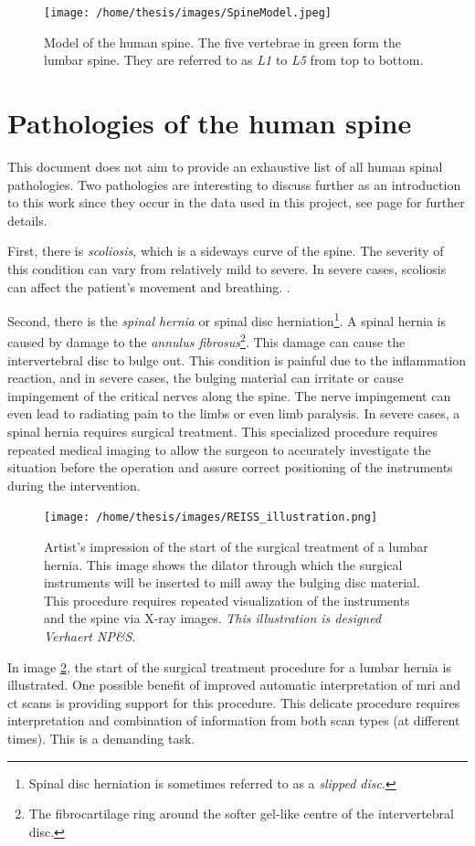 \begin{figure}
    \centering
    \texttt{[image: /home/thesis/images/SpineModel.jpeg]}
    \caption{\label{fig:spineimage}Model of the human spine. The five vertebrae in green form the lumbar spine. They are referred to as \textit{L1} to \textit{L5} from top to bottom. }
\end{figure}

\section{Pathologies of the human spine}
\par{
    This document does not aim to provide an exhaustive list of all human spinal pathologies. 
    Two pathologies are interesting to discuss further as an introduction to this work since they occur in the data used in this project, see page \pageref{sec:datasets} for further details.
}
\par{
    First, there is \textit{scoliosis}, which is a sideways curve of the spine.
    The severity of this condition can vary from relatively mild to severe. 
    In severe cases, scoliosis can affect the patient's movement and breathing.
    .
}
\par{
    Second, there is the \textit{spinal hernia} or spinal disc herniation\footnote{Spinal disc herniation is sometimes referred to as a \textit{slipped disc}.}. 
    A spinal hernia is caused by damage to the \textit{annulus fibrosus}\footnote{The fibrocartilage ring around the softer gel-like centre of the intervertebral disc.}. 
    This damage can cause the intervertebral disc to bulge out. 
    This condition is painful due to the inflammation reaction, and in severe cases, the bulging material can irritate or cause impingement of the critical nerves along the spine.
    The nerve impingement can even lead to radiating pain to the limbs or even limb paralysis.
    In severe cases, a spinal hernia requires surgical treatment.
    This specialized procedure requires repeated medical imaging to allow the surgeon to accurately investigate the situation before the operation and assure correct positioning of the instruments during the intervention.
}
\begin{figure}
    \centering
    \texttt{[image: /home/thesis/images/REISS\_illustration.png]}
    \caption{Artist's impression of the start of the surgical treatment of a lumbar hernia. 
    This image shows the dilator through which the surgical instruments will be inserted to mill away the bulging disc material.
    This procedure requires repeated visualization of the instruments and the spine via X-ray images. \textit{This illustration is designed Verhaert NP\&S}.\label{fig:REISS_procedure}}
\end{figure}
\par{
    In image \ref{fig:REISS_procedure}, the start of the surgical treatment procedure for a lumbar hernia is illustrated.
    One possible benefit of improved automatic interpretation of \acrshort{mri} and \acrshort{ct} scans is providing support for this procedure.
    This delicate procedure requires interpretation and combination of information from both scan types (at different times). This is a demanding task.
}


